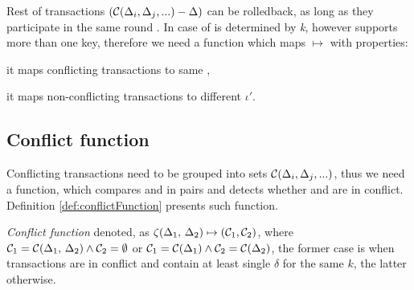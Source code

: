

Rest of transactions $(\mathcal{C}\text{$(\Delta_{i}, \Delta_{j}, ...)$} - \text{$\Delta$})$ can be rolledback, as long as they participate in the same \paxos round \paxosRoundId. In case of \lwt \paxosRoundId is determined by \emph{k}, however \mpt supports more than one key, therefore we need a function which maps \transaction $\mapsto $ \paxosRoundId with properties: 
\begin{enumerate*}
\item it maps conflicting transactions to same \paxosRoundId,
\item it maps non-conflicting transactions to different $\iota'$.
\end{enumerate*}

\subsection{Conflict function}
Conflicting transactions need to be grouped into sets $\mathcal{C}\text{$(\Delta_{i}, \Delta_{j}, ...)$}$, thus we need a function, which compares \txOne and \txTwo in pairs and detects whether
\txOne and \txTwo are in conflict. Definition \ref{def:conflictFunction} presents such function.

\begin{definition}
\label{def:conflictFunction}
\emph{Conflict function} denoted, as $\zeta (\text{$\Delta_{1}$, $\Delta_{2}$}) \mapsto ( \mathcal{C}_1, \mathcal{C}_2)$, where $\mathcal{C}_1 = \mathcal{C}(\text{$\Delta_{1}$, $\Delta_{2}$}) \wedge \mathcal{C}_2 = \emptyset $ or $\mathcal{C}_1 = \mathcal{C}(\text{$\Delta_{1}$}) \wedge \mathcal{C}_2=\mathcal{C}(\text{$\Delta_{2}$})$, the former case is when transactions are in conflict and contain at least single $\delta$ for the same $k$, the latter otherwise.
\end{definition}